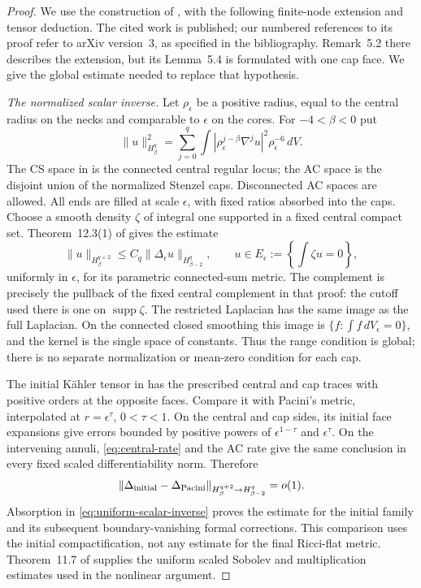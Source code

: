 \begin{proof}
We use the construction of \cite[Theorem~C]{benabida}, with the following
finite-node extension and tensor deduction. The cited work is published;
our numbered references to its proof refer to arXiv version~3, as specified
in the bibliography. Remark~5.2 there describes the extension, but its
Lemma~5.4 is formulated with one cap face. We give the global estimate
needed to replace that hypothesis.

\emph{The normalized scalar inverse.}
Let $\rho_\epsilon$ be a positive radius, equal to the central radius on
the necks and comparable to $\epsilon$ on the cores. For $-4<\beta<0$ put
\[
 \|u\|_{H_\beta^q}^2=
 \sum_{j=0}^q\int |\rho_\epsilon^{j-\beta}\nabla^ju|^2
                         \rho_\epsilon^{-6}\,dV.
\]
The CS space in \cite[Definitions~11.1 and~11.6]{pacini} is the connected
central regular locus; the AC space is the disjoint union of the normalized
Stenzel caps. Disconnected AC spaces are allowed. All ends are filled at
scale $\epsilon$, with fixed ratios absorbed into the caps. Choose a smooth
density $\zeta$ of integral one supported in a fixed central compact set.
Theorem~12.3(1) of \cite{pacini} gives the estimate
\begin{equation}\label{eq:uniform-scalar-inverse}
 \|u\|_{H_\beta^{q+2}}\le C_q\|\Delta_\epsilon u\|_{H_{\beta-2}^q},
 \qquad u\in E_\epsilon:=\left\{\int\zeta u=0\right\},
\end{equation}
uniformly in $\epsilon$, for its parametric connected-sum metric. The
complement is precisely the pullback of the fixed central complement in
that proof: the cutoff used there is one on $\operatorname{supp}\zeta$.
The restricted Laplacian has the same image as the full Laplacian. On the
connected closed smoothing this image is
$\{f:\int f\,dV_\epsilon=0\}$, and the kernel is the single space of
constants. Thus the range condition is global; there is no separate
normalization or mean-zero condition for each cap.

The initial K\"ahler tensor in \cite[Proposition~5.9]{benabida} has the
prescribed central and cap traces with positive orders at the opposite
faces. Compare it with Pacini's metric, interpolated at
$r=\epsilon^\tau$, $0<\tau<1$. On the central and cap sides, its initial
face expansions give errors bounded by positive powers of
$\epsilon^{1-\tau}$ and $\epsilon^\tau$. On the intervening annuli,
\eqref{eq:central-rate} and the AC rate give the same conclusion in every
fixed scaled differentiability norm. Therefore
\[
 \|\Delta_{\rm initial}-\Delta_{\rm Pacini}\|
       _{H_\beta^{q+2}\to H_{\beta-2}^q}=o(1).
\]
Absorption in \eqref{eq:uniform-scalar-inverse} proves the estimate for the
initial family and its subsequent boundary-vanishing formal corrections.
This comparison uses the initial compactification, not any estimate for
the final Ricci-flat metric. Theorem~11.7 of \cite{pacini} supplies the
uniform scaled Sobolev and multiplication estimates used in the nonlinear
argument.


\end{proof}
